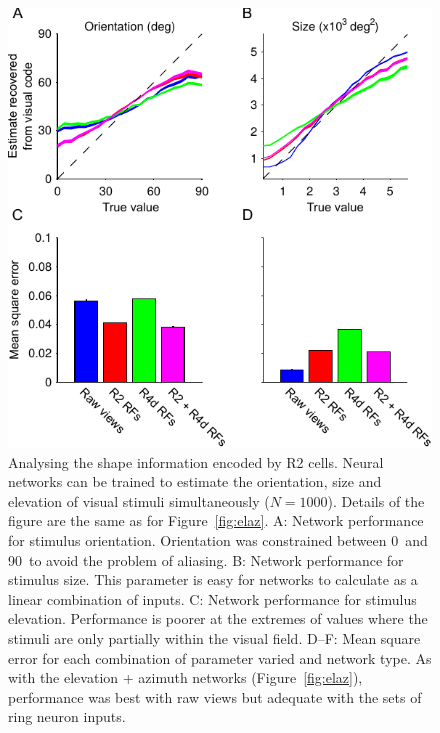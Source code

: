 \begin{figure}
\centering
\includegraphics{figures/orsi}
\caption{Analysing the shape information encoded by R2 cells.
Neural networks can be trained to estimate the orientation, size and elevation of visual stimuli simultaneously ($N=1000$).
Details of the figure are the same as for Figure~\ref{fig:elaz}.
A: Network performance for stimulus orientation.
Orientation was constrained between 0\degree\ and 90\degree\ to avoid the problem of aliasing.
B: Network performance for stimulus size.
This parameter is easy for networks to calculate as a linear combination of inputs.
C: Network performance for stimulus elevation.
Performance is poorer at the extremes of values where the stimuli are only partially within the visual field.
D--F: Mean square error for each combination of parameter varied and network type.
As with the elevation + azimuth networks (Figure~\ref{fig:elaz}), performance was best with raw views but adequate with the sets of ring neuron inputs.
}
\label{fig:orsi}
\end{figure}
